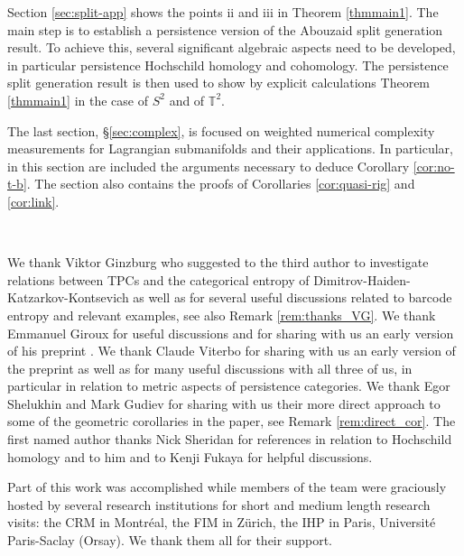 Section \ref{sec:split-app} shows 
the points ii and iii in Theorem \ref{thmmain1}. The main step is to establish a persistence
version of the Abouzaid split generation result. To achieve this, several significant algebraic aspects need to be developed, in particular persistence Hochschild homology and cohomology. The persistence split generation result is then used to show  by explicit calculations Theorem \ref{thmmain1} in the case of $S^{2}$ and of $\mathbb{T}^{2}$.

The last section, \S\ref{sec:complex}, is focused on weighted numerical complexity measurements for Lagrangian
submanifolds and their applications. In particular, in this section are included the arguments necessary to deduce Corollary \ref{cor:no-t-b}. The section also contains the proofs of 
Corollaries  \ref{cor:quasi-rig} and \ref{cor:link}.

 
 \
 
  
  We thank Viktor Ginzburg who suggested to the third author to investigate relations between TPCs and the categorical entropy of Dimitrov-Haiden-Katzarkov-Kontsevich as well as for several useful discussions related to barcode entropy and relevant examples, see also Remark \ref{rem:thanks_VG}. We  thank  Emmanuel Giroux  for useful discussions and for sharing with us an early version of his preprint \cite{Gir:Lef-cot}. We thank Claude Viterbo for sharing with us an early version of the preprint \cite{Gu-Vi-Zh:approx} as well as for many useful discussions with all three of us, in particular in relation to metric aspects of 
 persistence categories. We thank Egor Shelukhin  and Mark Gudiev for 
 sharing with us their more direct approach to some of the geometric corollaries in the paper, see Remark \ref{rem:direct_cor}. The first named author thanks  Nick Sheridan for references in relation to Hochschild homology and to him and to Kenji Fukaya for helpful discussions.   

Part of this work was accomplished while  members of the team were graciously hosted by several 
research institutions for short and medium length research visits:  the CRM in Montr\'eal, 
the FIM in Z\"urich, the IHP in Paris, Universit\'e Paris-Saclay (Orsay). 
We thank them all for their support. 
 
